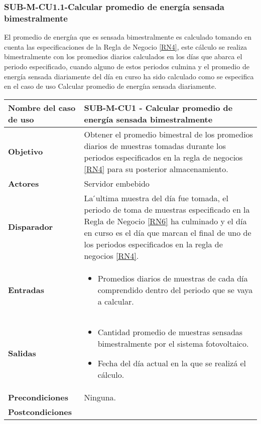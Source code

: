 \subsubsection{SUB-M-CU1.1-Calcular promedio de energía sensada bimestralmente}\label{SUB-M-CU1.1}
El  promedio  de  energíıa  que  es  sensada  bimestralmente  es  calculado  tomando  en  cuenta  las especificaciones de la Regla de Negocio \ref{RN4}, este cálculo se realiza bimestralmente con los promedios diarios calculados en los días que abarca el periodo especificado, cuando alguno de estos
periodos culmina y el promedio de energía sensada diariamente del día en curso ha sido calculado como se especifica en el caso de uso Calcular promedio de energíıa sensada diariamente.


\begin{longtable}{|J{5cm}|J{10.3cm}|}
	\hline
	\textbf{Nombre del caso de uso} &
		SUB-M-CU1 - Calcular promedio de energía sensada bimestralmente
 \\ \hline
	\textbf{Objetivo} &
		Obtener  el  promedio  bimestral  de  los  promedios  diarios  de muestras tomadas durante los periodos especificados en la regla de negocios  \ref{RN4} para su posterior almacenamiento.
 \\ \hline
	\textbf{Actores} &
		Servidor embebido \\ \hline 
	\textbf{Disparador} & 
		La  ́ultima muestra del día fue tomada, el periodo de toma de muestras especificado en la Regla de Negocio \ref{RN6} ha culminado y el día en curso es el día que marcan el final de uno de los periodos especificados en la regla de negocios \ref{RN4}. \\ \hline 
	\textbf{Entradas} & 
		\begin{itemize}
				\item Promedios diarios de muestras de cada día comprendido dentro del periodo que se vaya a calcular.
		\end{itemize}\\ \hline 
	\textbf{Salidas} & 
		\begin{itemize}
			\item Cantidad promedio de muestras sensadas bimestralmente por el sistema fotovoltaico.
			\item Fecha del día actual en la que se realizá el cálculo.
		\end{itemize} \\ \hline
	\textbf{Precondiciones} &
		Ninguna.\\ \hline
	\textbf{Postcondiciones} &

\end{longtable}
